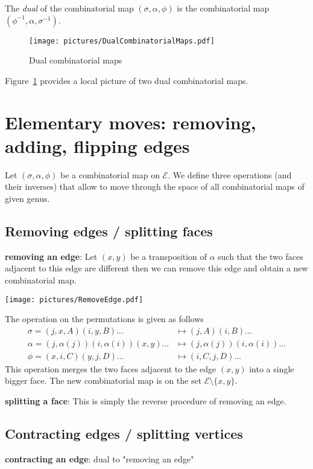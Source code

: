 \documentclass[a4paper,12pt]{article}
\def\cE{\mathcal{E}}
\begin{document}
The \emph{dual} of the combinatorial map $(\sigma, \alpha, \phi)$ is the combinatorial
map $(\phi^{-1}, \alpha, \sigma^{-1})$.
\begin{figure}[!ht]
\begin{center}
\texttt{[image: pictures/DualCombinatorialMaps.pdf]}
\end{center}
\caption{Dual combinatorial maps}
\label{fig:DualCombinatorialMaps}
\end{figure}

Figure~\ref{fig:DualCombinatorialMaps} provides a local picture of two dual
combinatorial maps.

\section{Elementary moves: removing, adding, flipping edges}
\label{sec:ElementaryMoves}
Let $(\sigma, \alpha, \phi)$ be a combinatorial map on $\cE$. We define three operations
(and their inverses) that allow to move through the space of all combinatorial maps of given genus.

\subsection{Removing edges / splitting faces}
\noindent\textbf{removing an edge}:
Let $(x,y)$ be a transposition of $\alpha$ such that the two faces adjacent to this
edge are different then we can remove this edge and obtain a new combinatorial map.
\begin{center}\texttt{[image: pictures/RemoveEdge.pdf]}\end{center}
The operation on the permutations is given as follows
\begin{align*}
\sigma = (j,x,A) (i,y,B) \ldots & \mapsto (j,A) (i,B) \ldots \\
\alpha = (j, \alpha(j)) (i, \alpha(i)) (x,y) \ldots & \mapsto (j, \alpha(j)) (i, \alpha(i)) \ldots \\
\phi = (x,i,C) (y,j,D) \ldots & \mapsto (i,C,j,D) \ldots
\end{align*}
This operation merges the two faces adjacent to the edge $(x,y)$ into a single bigger face.
The new combinatorial map is on the set $\cE \setminus \{x,y\}$.

\noindent\textbf{splitting a face}:
This is simply the reverse procedure of removing an edge.

\subsection{Contracting edges / splitting vertices}
\noindent\textbf{contracting an edge}:
dual to "removing an edge"
\end{document}
